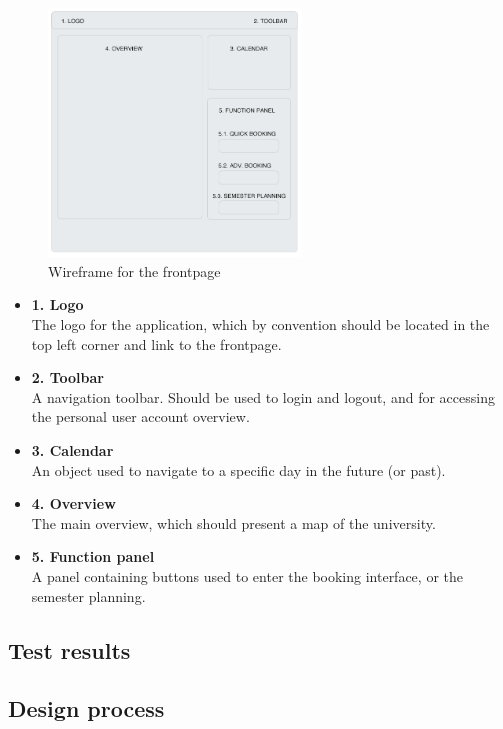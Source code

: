 \begin{figure}[htb]
\begin{center}
\leavevmode
\includegraphics[width=0.6\textwidth]{images/wireframe1}
\end{center}
\caption{Wireframe for the frontpage}
\label{fig:wireframe_frontpage}
\end{figure}

\begin{itemize}
	\item \textbf{1. Logo}\\
	The logo for the application, which by convention should be located in the top left corner and link to the frontpage. \cite{steve}
	\item \textbf{2. Toolbar}\\
	A navigation toolbar. Should be used to login and logout, and for accessing the personal user account overview.
	\item \textbf{3. Calendar}\\
	An object used to navigate to a specific day in the future (or past).
	\item \textbf{4. Overview}\\
	The main overview, which should present a map of the university.
	\item \textbf{5. Function panel}\\
	A panel containing buttons used to enter the booking interface, or the semester planning.
\end{itemize}


\subsection{Test results}

\subsection{Design process}
\label{sec:design_process}

